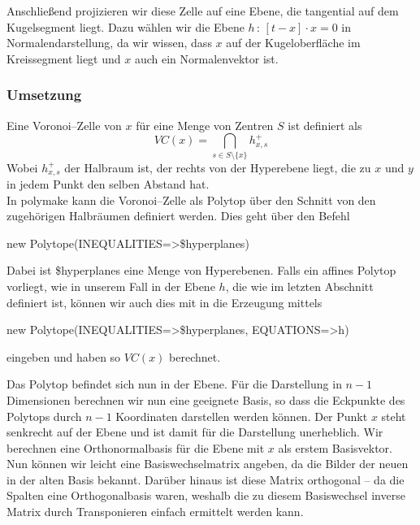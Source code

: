             Anschließend projizieren wir diese Zelle auf eine Ebene, die tangential auf dem Kugelsegment liegt. Dazu wählen wir die Ebene $h \, : \, [t - x] \cdot x = 0$ in Normalendarstellung, da wir wissen, dass $x$ auf der Kugeloberfläche im Kreissegment liegt und $x$ auch ein Normalenvektor ist.
            
        \subsubsection*{Umsetzung}
         Eine Voronoi--Zelle von $x$ für eine Menge von Zentren $S$ ist definiert als 
         $$ VC(x) = \bigcap_{s \in S \setminus \{ x \}} h^+_{x,s}$$
         Wobei $h^+_{x,s}$ der Halbraum ist, der rechts von der Hyperebene liegt, die zu $x$ und $y$ in jedem Punkt den selben Abstand hat.\\
         
         \noindent In polymake kann die Voronoi--Zelle als Polytop über den Schnitt von den zugehörigen Halbräumen definiert werden. Dies geht über den Befehl

         \begin{code}
            new Polytope(INEQUALITIES=>\$hyperplanes)
         \end{code}

         Dabei ist \$hyperplanes eine Menge von Hyperebenen. Falls ein affines Polytop vorliegt, wie in unserem Fall in der Ebene $h$, die wie im letzten Abschnitt
         definiert ist, können wir auch dies mit in die Erzeugung mittels

         \begin{code}
new Polytope(INEQUALITIES=>\$hyperplanes, EQUATIONS=>{h})
         \end{code}

         eingeben und haben so $VC(x)$ berechnet.
         
         \noindent Das Polytop befindet sich nun in der Ebene. Für die Darstellung in $n-1$ Dimensionen berechnen wir nun eine geeignete Basis, so dass die Eckpunkte des Polytops durch $n-1$ Koordinaten darstellen werden können. 
         Der Punkt $x$ steht senkrecht auf der Ebene und ist damit für die Darstellung 
         unerheblich. Wir berechnen eine Orthonormalbasis für die Ebene mit $x$ als erstem Basisvektor. Nun können wir leicht eine Basiswechselmatrix angeben,
         da die Bilder der neuen in der alten Basis bekannt. Darüber hinaus ist diese Matrix orthogonal -- da die Spalten eine Orthogonalbasis waren, weshalb die zu diesem Basiswechsel inverse Matrix durch Transponieren einfach ermittelt werden kann.

